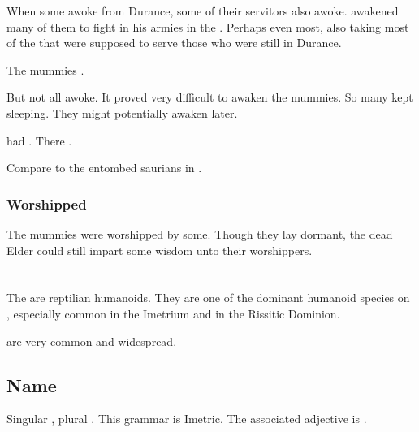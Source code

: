 When some \dragons awoke from Durance, some of their servitors also awoke. 
\Sethicus awakened many of them to fight in his armies in the \firstbanewar. 
Perhaps even most, also taking most of the \ophidians that were supposed to serve those \dragons who were still in Durance. 

The \ophidian mummies .

But not all awoke.
It proved very difficult to awaken the \ophidian mummies. 
So many kept sleeping. 
They might potentially awaken later.

 had . 
There . 

Compare to the entombed saurians in \cite{Nile:InTheirDarkenesShrines}. 





\subsubsection{Worshipped}
The mummies were worshipped by some. 
Though they lay dormant, the dead Elder \ophidians could still impart some wisdom unto their worshippers. 
















\section[Scatha]{\Scatha}
The \scathae{} are reptilian humanoids. They are one of the dominant humanoid species on \Miith{}, especially common in the Imetrium and in the Rissitic Dominion. 

\Scathae{} are very common and widespread. %









\subsection{Name}
Singular \emph{\scatha{}}, plural \emph{\scathae{}}. 
This grammar is Imetric. 
The associated adjective is \emph{\scathaese{}}. 

